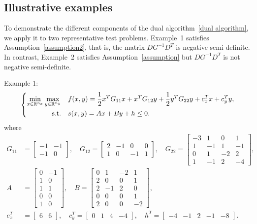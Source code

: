 \documentclass{article}
\begin{document}
	\subsection{Illustrative examples}
	To demonstrate the different components of the dual algorithm~\ref{dual algorithm}, we apply it to two representative test problems. 
	Example~1 satisfies Assumption~\ref{assumption2}, that is, the matrix $DG^{-1}D^{T}$ is negative semi-definite. 
	In contrast, Example~2 satisfies Assumption~\ref{assumption} but $DG^{-1}D^{T}$ is not negative semi-definite.

	Example 1:
	\begin{align}
		\left\lbrace
		\begin{aligned}
			\min_{x\in\mathbb{R}^{n_{x}}}\max_{y\in\mathbb{R}^{n_{y}}}\quad& f(x, y) = \frac{1}{2}x^{T}G_{11}x + x^{T}G_{12}y + \frac{1}{2}y^{T}G_{22}y + c_{x}^{T}x + c_{y}^{T}y,\\
			{\rm s.t.}\quad & s(x, y) = Ax + By + h \leq 0.
		\end{aligned}\right.
	\end{align}
	where
	\begin{align*}
		G_{11} & = \begin{bmatrix}
			-1 & -1\\
			-1 & 0
		\end{bmatrix}, \quad G_{12} = \begin{bmatrix}
			2 &	-1 & 0 & 0\\
			1 &	0 &	-1 & 1
		\end{bmatrix}, \quad G_{22} = \begin{bmatrix}
			-3 & 1 & 0 & 1\\
			1 & -1 & 1 & -1\\
			0 & 1 & -2 & 2\\
			1 & -1 & 2 & -4
		\end{bmatrix},\\
		A & = \begin{bmatrix}
			0 & -1\\
			1 & 0\\
			1 & 1\\
			0 & 0\\
			1 & 0
		\end{bmatrix},\quad B = \begin{bmatrix}
			0 & 1 & -2 & 1\\
			2 & 0 & 0 & 1\\
			2 & -1 & 2 & 0\\
			0 & 0 & 0 & 1\\
			2 & 0 & 0 & -2
		\end{bmatrix},\\
		c_{x}^{T} & = \begin{bmatrix}
			6 & 6
		\end{bmatrix}, \quad c_{y}^{T} = \begin{bmatrix}
		0 & 1 & 4 & -4
		\end{bmatrix},\quad h^{T} = \begin{bmatrix}
			-4 & -1 & 2 & -1 & -8
		\end{bmatrix}.
	\end{align*}
\end{document}
